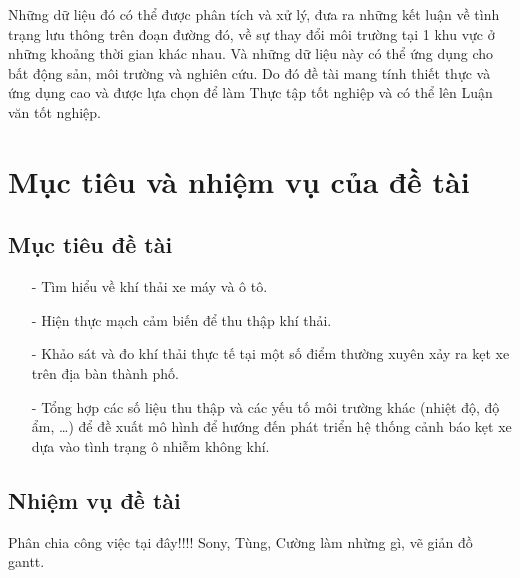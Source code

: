 Những dữ liệu đó có thể được phân tích và xử lý, đưa ra những kết luận về tình trạng lưu thông trên đoạn đường đó, về sự thay đổi môi trường tại 1 khu vực ở những khoảng thời gian khác nhau. Và những dữ liệu này có thể ứng dụng cho bất động sản, môi trường và nghiên cứu. Do đó đề tài mang tính thiết thực và ứng dụng cao và được lựa chọn để làm Thực tập tốt nghiệp và có thể lên Luận văn tốt nghiệp.




\section{Mục tiêu và nhiệm vụ của đề tài} %
\label{section1.2}
\subsection{Mục tiêu đề tài}
\begin{itemize}
\item[-]Tìm hiểu về khí thải xe máy và ô tô.

\item[-]Hiện thực mạch cảm biến để thu thập khí thải.

\item[-]Khảo sát và đo khí thải thực tế tại một số điểm thường xuyên xảy ra kẹt xe trên địa bàn thành phố.

\item[-]Tổng hợp các số liệu thu thập và các yếu tố môi trường khác (nhiệt độ, độ ẩm, …) để đề xuất mô hình để hướng đến phát triển hệ thống cảnh báo kẹt xe dựa vào tình trạng ô nhiễm không khí.




\end{itemize}

\subsection{Nhiệm vụ đề tài}
Phân chia công việc tại đây!!!! Sony, Tùng, Cường làm nhừng gì, vẽ giản đồ gantt.


